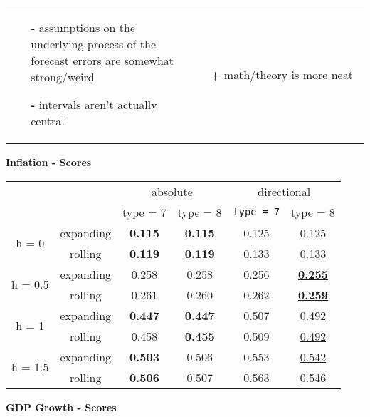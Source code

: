 \documentclass{article}
\begin{document}
\begin{center}
\begin{tabular}{ p{0.5\linewidth} |p{0.5\linewidth} }
\begin{itemize}
\item[\textbf{-}] assumptions on the underlying process of the forecast errors are somewhat strong/weird
\item[\textbf{-}] intervals aren't actually central
\end{itemize} & 
\begin{itemize}
\item[\textbf{+}] math/theory is more neat
\end{itemize} \\ 
\end{tabular}
\end{center}

\newpage
\noindent
\Large{\textbf{Inflation - Scores}}\bigskip
\normalsize
\begin{center}
\begin{tabular}{ cccc c  c  } 

&&\multicolumn{2}{c}{\underline{absolute}}&\multicolumn{2}{c}{\underline{directional}}\\
 && type = 7 & type = 8 & \texttt{type = 7} & type = 8\\[0.8em]

\multirow{2}{4em}{h = 0} &expanding & \textbf{0.115} & \textbf{0.115}  &0.125  & 0.125 \\ 
&rolling & \textbf{0.119}  & \textbf{0.119}  &0.133 & 0.133 \\[0.5em]
\multirow{2}{4em}{h = 0.5} &expanding & 0.258  & 0.258  &0.256   & \textbf{\underline{0.255}}  \\ 
&rolling & 0.261  & 0.260  &0.262  & \textbf{\underline{0.259}} \\[0.5em]
\multirow{2}{4em}{h = 1} &expanding & \textbf{0.447}  & \textbf{0.447}  &0.507  & \underline{0.492} \\ 
&rolling & 0.458  & \textbf{0.455}  & 0.509 & \underline{0.492} \\[0.5em]
\multirow{2}{4em}{h = 1.5} &expanding & \textbf{0.503}  &  0.506 &0.553  & \underline{0.542} \\ 
&rolling & \textbf{0.506}  & 0.507  &0.563  & \underline{0.546} \\ 
\end{tabular}
\end{center}
\vspace{2cm}
\Large{\textbf{GDP Growth - Scores}} \bigskip
\normalsize
\end{document}
